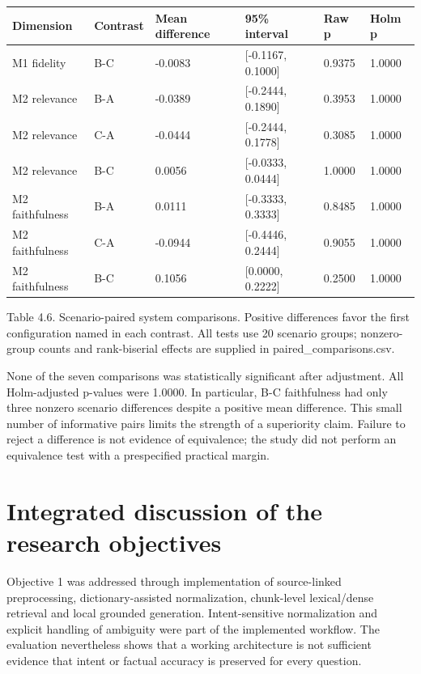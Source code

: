{\small\begin{longtable}{@{}p{0.95in}p{0.95in}p{0.95in}p{0.95in}p{0.95in}p{0.95in}@{}}\toprule

Dimension & Contrast & Mean difference & 95\% interval & Raw p & Holm p \\ \midrule\endhead

M1 fidelity & B-C & -0.0083 & [-0.1167, 0.1000] & 0.9375 & 1.0000 \\

M2 relevance & B-A & -0.0389 & [-0.2444, 0.1890] & 0.3953 & 1.0000 \\

M2 relevance & C-A & -0.0444 & [-0.2444, 0.1778] & 0.3085 & 1.0000 \\

M2 relevance & B-C & 0.0056 & [-0.0333, 0.0444] & 1.0000 & 1.0000 \\

M2 faithfulness & B-A & 0.0111 & [-0.3333, 0.3333] & 0.8485 & 1.0000 \\

M2 faithfulness & C-A & -0.0944 & [-0.4446, 0.2444] & 0.9055 & 1.0000 \\

M2 faithfulness & B-C & 0.1056 & [0.0000, 0.2222] & 0.2500 & 1.0000 \\

\bottomrule\end{longtable}}

Table 4.6. Scenario-paired system comparisons. Positive differences favor the first configuration named in each contrast. All tests use 20 scenario groups; nonzero-group counts and rank-biserial effects are supplied in paired\_comparisons.csv.


None of the seven comparisons was statistically significant after adjustment. All Holm-adjusted p-values were 1.0000. In particular, B-C faithfulness had only three nonzero scenario differences despite a positive mean difference. This small number of informative pairs limits the strength of a superiority claim. Failure to reject a difference is not evidence of equivalence; the study did not perform an equivalence test with a prespecified practical margin.


\section{Integrated discussion of the research objectives}

Objective 1 was addressed through implementation of source-linked preprocessing, dictionary-assisted normalization, chunk-level lexical/dense retrieval and local grounded generation. Intent-sensitive normalization and explicit handling of ambiguity were part of the implemented workflow. The evaluation nevertheless shows that a working architecture is not sufficient evidence that intent or factual accuracy is preserved for every question.


